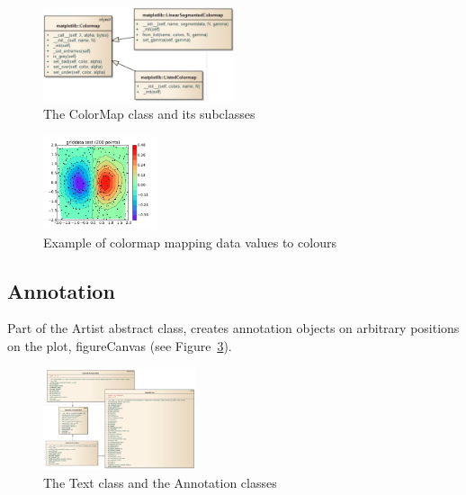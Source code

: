 \documentclass[pdftex,10pt,a4paper]{report}
\begin{document}
\begin{figure}[ht!]
        \centering
                \includegraphics[width=0.5\textwidth]{img/umls/kevin/cm}
        \caption{The ColorMap class and its subclasses}\label{fig:cm}
\end{figure}

\begin{figure}[ht!]
        \centering
                \includegraphics[width=0.3\textwidth]{img/umls/kevin/griddata}
        \caption{Example of colormap mapping data values to colours}\label{fig:cm_e}
\end{figure}

\subsection{Annotation}

Part of the Artist abstract class, creates annotation objects on arbitrary positions on the plot, figureCanvas (see Figure~\ref{fig:ann}).

\begin{figure}[ht!]
        \centering
                \includegraphics[width=0.4\textwidth]{img/umls/derek/annotation}
        \caption{The Text class and the Annotation classes}\label{fig:ann}
\end{figure}
\end{document}

